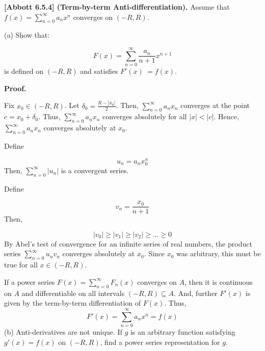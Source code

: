 \documentclass[10pt]{article}
\begin{document}
\textbf{[Abbott 6.5.4] (Term-by-term Anti-differentiation). }Assume that $\displaystyle f( x) =\sum _{n=0}^{\infty } a_{n} x^{n}$ converges on $\displaystyle ( -R,R)$. 



(a) Show that:


\begin{equation*}
F( x) =\sum _{n=0}^{\infty }\frac{a_{n}}{n+1} x^{n+1}
\end{equation*}
is defined on $\displaystyle ( -R,R)$ and satisfies $\displaystyle F'( x) \ =f( x)$.



\textbf{Proof.}



Fix $\displaystyle x_{0} \in ( -R,R)$. Let $\displaystyle \delta _{0} =\frac{R-|x_{0} |}{2}$. Then, $\displaystyle \sum _{n=0}^{\infty } a_{n} x_{n}$ converges at the point $\displaystyle c=x_{0} +\delta _{0}$. Thus, $\displaystyle \sum _{n=0}^{\infty } a_{n} x_{n}$ converges absolutely for all $\displaystyle |x|< |c|$. Hence, $\displaystyle \sum _{n=0}^{\infty } a_{n} x_{n}$ converges absolutely at $\displaystyle x_{0}$. 



Define


\begin{equation*}
u_{n} =a_{n} x_{0}^{n}
\end{equation*}
Then, $\displaystyle \sum _{n=0}^{\infty } |u_{n} |$ is a convergent series. 

Define 


\begin{equation*}
v_{n} =\frac{x_{0}}{n+1}
\end{equation*}
Then,


\begin{equation*}
|v_{0} |\geq |v_{1} |\geq |v_{2} |\geq \dotsc \geq 0
\end{equation*}
By Abel's test of convergence for an infinite series of real numbers, the product series $\displaystyle \sum _{n=0}^{\infty } u_{n} v_{n}$ converges absolutely at $\displaystyle x_{0}$. Since $\displaystyle x_{0}$ was arbitrary, this must be true for all $\displaystyle x\in ( -R,R)$. 



If a power series $\displaystyle F( x) =\sum _{n=0}^{\infty } F_{n}( x)$ converges on $\displaystyle A$, then it is continuous on $\displaystyle A$ and differentiable on all intervals $\displaystyle ( -R,R) \subseteq A$. And, further $\displaystyle F'( x)$ is given by the term-by-term differentiation of $\displaystyle F( x)$. Thus, 
\begin{equation*}
F'( x) =\sum _{n=0}^{\infty } a_{n} x^{n} =f( x)
\end{equation*}
(b) Anti-derivatives are not unique. If $\displaystyle g$ is an arbitrary function satisfying $\displaystyle g'( x) =f( x)$ on $\displaystyle ( -R,R)$, find a power series representation for $\displaystyle g$.
\end{document}
